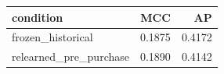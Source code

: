 \begin{tabular}{lrr}
\toprule
condition & MCC & AP \\
\midrule
frozen_historical & 0.1875 & 0.4172 \\
relearned_pre_purchase & 0.1890 & 0.4142 \\
\bottomrule
\end{tabular}
